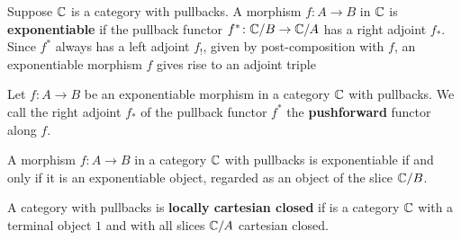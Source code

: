 \begin{definition}\label{defn:exponentiable-morphism}
   \leanok
    Suppose $\mathbb{C}$ is a category with pullbacks.
    A morphism $f \colon A \to B$ in $\mathbb{C}$ is \textbf{exponentiable} if the pullback functor
    $f^* \colon \mathbb{C} / B \to \mathbb{C} / A$ has a right adjoint $f_*$.
    Since $f^*$ always has a left adjoint $f_!$, given by post-composition with $f$, an
    exponentiable morphism $f$ gives rise to an adjoint triple
    \begin{center}\end{center}
\end{definition}

\begin{definition}\label{rmk:pushforward}
   \leanok
  Let $f \colon A \to B$ be an exponentiable morphism in a category $\mathbb{C}$ with pullbacks.
  We call the right adjoint $f_*$ of the pullback functor $f^*$ the \textbf{pushforward} functor
  along $f$.
\end{definition}

\begin{theorem}\label{thm:exponentiable-mor-exponentiable-obj}
  \leanok
  A morphism $f \colon A \to B$ in a category $\mathbb{C}$ with pullbacks is exponentiable if and only if
  it is an exponentiable object, regarded as an object of the slice $\mathbb{C} / B$.
\end{theorem}


\begin{definition}\label{defn:LCCC}
 \leanok
  A category with pullbacks is \textbf{locally cartesian closed} if
  is a category $\mathbb{C}$ with a terminal object $1$ and with all slices $\mathbb{C} / A$ cartesian closed.
\end{definition}
